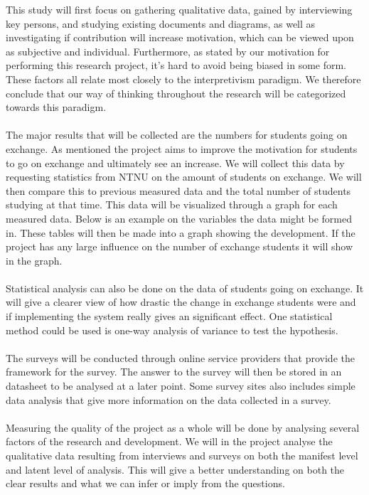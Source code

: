 This study will first focus on gathering qualitative data, gained by interviewing key persons, and studying existing documents and diagrams, as well as investigating if contribution will increase motivation, which can be viewed upon as subjective and individual. Furthermore, as stated by our motivation for performing this research project, it’s hard to avoid being biased in some form. These factors all relate most closely to the interpretivism paradigm. We therefore conclude that our way of thinking throughout the research will be categorized towards this paradigm.
\\\\
The major results that will be collected are the numbers for students going on exchange. As mentioned the project aims to improve the motivation for students to go on exchange and ultimately see an increase. We will collect this data by requesting statistics from NTNU on the amount of students on exchange. We will then compare this to previous measured data and the total number of students studying at that time. This data will be visualized through a graph for each measured data. Below is an example on the variables the data might be formed in. These tables will then be made into a graph showing the development. If the project has any large influence on the number of exchange students it will show in the graph.
\\\\
Statistical analysis can also be done on the data of students going on exchange. It will give a clearer view of how drastic the change in exchange students were and if implementing the system really gives an significant effect. One statistical method could be used is one-way analysis of variance to test the hypothesis. 
\\\\
The surveys will be conducted through online service providers that provide the framework for the survey. The answer to the survey will then be stored in an datasheet to be analysed at a later point. Some survey sites also includes simple data analysis that give more information on the data collected in a survey.
\\\\
Measuring the quality of the project as a whole will be done by analysing several factors of the research and development. We will in the project analyse the qualitative data resulting from interviews and surveys on both the manifest level and latent level of analysis. This will give a better understanding on both the clear results and what we can infer or imply from the questions. 
